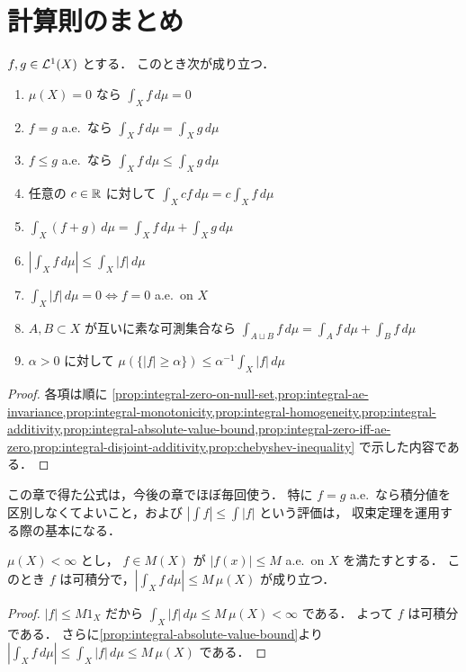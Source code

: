 \section{計算則のまとめ}

\begin{theorem}[測度空間上の積分の基本公式]\label{thm:lebesgue-integral-basic-formulas}
$f,g\in\mathcal L^1(X)$ とする．
このとき次が成り立つ．
\begin{enumerate}
    \item $\mu(X)=0$ なら $\int_X f\,d\mu=0$
    \item $f=g$ a.e.\ なら $\int_X f\,d\mu=\int_X g\,d\mu$
    \item $f\le g$ a.e.\ なら $\int_X f\,d\mu\le \int_X g\,d\mu$
    \item 任意の $c \in \mathbb R$ に対して $\int_X cf\,d\mu=c\int_X f\,d\mu$
    \item $\int_X (f+g)\,d\mu=\int_X f\,d\mu+\int_X g\,d\mu$
    \item $\left|\int_X f\,d\mu\right|\le \int_X |f|\,d\mu$
    \item $\int_X |f|\,d\mu=0 \iff f=0$ a.e.\ on $X$
    \item $A,B \subset X$ が互いに素な可測集合なら $\int_{A \sqcup B} f\,d\mu=\int_A f\,d\mu+\int_B f\,d\mu$
    \item $\alpha>0$ に対して $\mu(\{|f|\ge \alpha\})\le \alpha^{-1}\int_X |f|\,d\mu$
\end{enumerate}
\end{theorem}
\begin{proof}
各項は順に
\cref{prop:integral-zero-on-null-set,prop:integral-ae-invariance,prop:integral-monotonicity,prop:integral-homogeneity,prop:integral-additivity,prop:integral-absolute-value-bound,prop:integral-zero-iff-ae-zero,prop:integral-disjoint-additivity,prop:chebyshev-inequality}
で示した内容である．
\end{proof}

\begin{remark}
この章で得た公式は，今後の章でほぼ毎回使う．
特に $f=g$ a.e.\ なら積分値を区別しなくてよいこと，および $\left|\int f\right|\le \int |f|$ という評価は，
収束定理を運用する際の基本になる．
\end{remark}

\begin{example}
$\mu(X)<\infty$ とし，
$f\in M(X)$ が $|f(x)|\le M$ a.e.\ on $X$ を満たすとする．
このとき $f$ は可積分で，$\left|\int_X f\,d\mu\right|\le M\,\mu(X)$ が成り立つ．
\end{example}
\begin{proof}
$|f|\le M1_X$ だから $\int_X |f|\,d\mu\le M\,\mu(X)<\infty$ である．
よって $f$ は可積分である．
さらに\cref{prop:integral-absolute-value-bound}より
$\left|\int_X f\,d\mu\right|\le \int_X |f|\,d\mu\le M\,\mu(X)$ である．
\end{proof}

